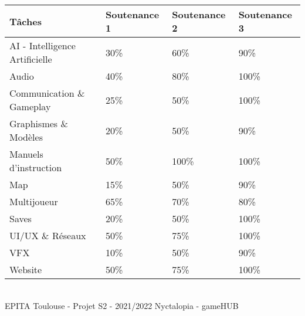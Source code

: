 \begin{center}
\begin{tabular}{|l|l|l|l|}
\hline
Tâches                         & Soutenance 1 & Soutenance 2 & Soutenance 3 \\ \hline
AI - Intelligence Artificielle & 30\%         & 60\%         & 90\%         \\ \hline
Audio                          & 40\%         & 80\%         & 100\%        \\ \hline
Communication \& Gameplay       & 25\%         & 50\%         & 100\%        \\ \hline
Graphismes \& Modèles          & 20\%         & 50\%         & 90\%         \\ \hline
Manuels d'instruction                       & 50\%         & 100\%        & 100\%        \\ \hline
Map                            & 15\%         & 50\%         & 90\%         \\ \hline
Multijoueur                    & 65\%         & 70\%         & 80\%         \\ \hline
Saves                          & 20\%         & 50\%         & 100\%        \\ \hline
UI/UX \& Réseaux             & 50\%         & 75\%         & 100\%        \\ \hline
VFX                            & 10\%         & 50\%         & 90\%         \\ \hline
Website                        & 50\%         & 75\%         & 100\%        \\ \hline
\end{tabular}
\end{center}

\vfill
\noindent\makebox[\linewidth]{\rule{.8\paperwidth}{.6pt}}\\[0.2cm]
EPITA Toulouse - Projet S2 - 2021/2022 \hfill Nyctalopia - gameHUB
\noindent\makebox[\linewidth]{\rule{.8\paperwidth}{.6pt}}
\newpage